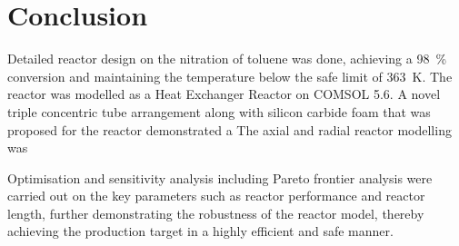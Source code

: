 \section{Conclusion} \label{sec:conclusion}
Detailed reactor design on the nitration of toluene was done, achieving a \SI{98}{\%} conversion and maintaining the temperature below the safe limit of \SI{363}{\K}. The reactor was modelled as a Heat Exchanger Reactor on COMSOL 5.6. A novel triple concentric tube arrangement along with silicon carbide foam that was proposed for the reactor demonstrated a 
The axial and radial reactor modelling was 

Optimisation and sensitivity analysis including Pareto frontier analysis were carried out on the key parameters such as reactor performance and reactor length, further demonstrating the robustness of the reactor model, thereby achieving the production target in a highly efficient and safe manner.  

